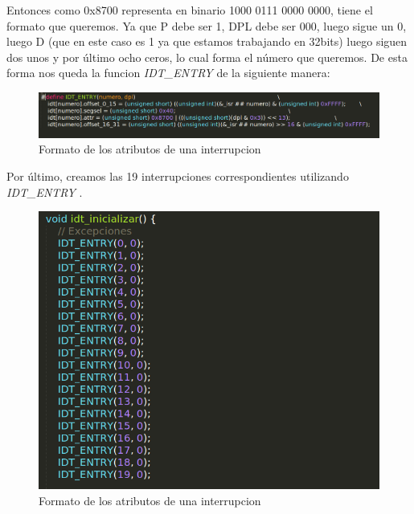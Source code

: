 Entonces como 0x8700 representa en binario 1000 0111 0000 0000, tiene el formato que queremos. Ya que P debe ser 1, DPL debe ser 000, luego sigue un 0, luego D (que en este caso es 1 ya que estamos trabajando en 32bits) luego siguen dos unos y por último ocho ceros, lo cual forma el número que queremos. De esta forma nos queda la funcion \textit{IDT\_ENTRY} de la siguiente manera:

 \begin{figure}[H]
\begin{center}
  \includegraphics[width=\linewidth]{ejercicio2/idtentry.png}
  \caption{{\small Formato de los atributos de una interrupcion} }
\endminipage
\end{center}
\end{figure}

Por último, creamos las 19 interrupciones correspondientes utilizando \textit{IDT\_ENTRY}  .

 \begin{figure}[H]
\begin{center}
  \includegraphics[width=\linewidth]{ejercicio2/idt.png}
  \caption{{\small Formato de los atributos de una interrupcion} }
\endminipage
\end{center}
\end{figure}

